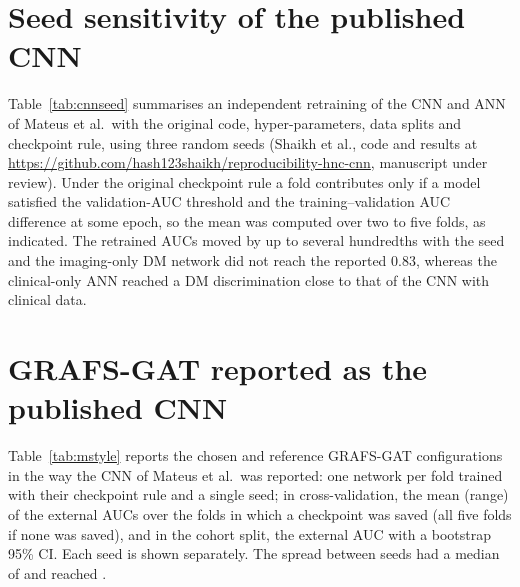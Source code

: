 \documentclass[11pt]{article}
\newcommand{\method}{GRAFS-GAT}  %
\begin{document}
\begin{table}[!htb]
\centering
\caption{Configurations chosen on validation AUC in the GTV-only sensitivity analysis.}\label{tab:gtvcfg}
\resizebox{\textwidth}{!}{}
\end{table}

\section{Seed sensitivity of the published CNN}

Table~\ref{tab:cnnseed} summarises an independent retraining of the CNN and ANN of Mateus et al.\ with the original code, hyper-parameters, data splits and checkpoint rule, using three random seeds (Shaikh et al., code and results at \url{https://github.com/hash123shaikh/reproducibility-hnc-cnn}, manuscript under review). Under the original checkpoint rule a fold contributes only if a model satisfied the validation-AUC threshold and the training--validation AUC difference at some epoch, so the mean was computed over two to five folds, as indicated. The retrained AUCs moved by up to several hundredths with the seed and the imaging-only DM network did not reach the reported 0.83, whereas the clinical-only ANN reached a DM discrimination close to that of the CNN with clinical data.

\begin{table}[!htb]
\centering
\caption{External AUC on MAASTRO of the CNN and ANN of Mateus et al.\ in 5-fold CV: values reported in the original study and mean over the contributing folds after retraining with three seeds (number of contributing folds in brackets). Spread, difference between the highest and lowest seed.}\label{tab:cnnseed}
\small

\end{table}

\section{\method{} reported as the published CNN}

Table~\ref{tab:mstyle} reports the chosen and reference \method{} configurations in the way the CNN of Mateus et al.\ was reported: one network per fold trained with their checkpoint rule and a single seed; in cross-validation, the mean (range) of the external AUCs over the folds in which a checkpoint was saved (all five folds if none was saved), and in the cohort split, the external AUC with a bootstrap 95\% CI. Each seed is shown separately. The spread between seeds had a median of \msSpreadMed{} and reached \msSpreadMax.
\end{document}
